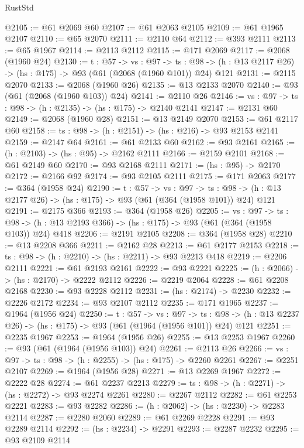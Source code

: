 \begin{lexlean}{RustStd}
\begin{coremodule}
@2105 := @61 @2069 @60
@2107 := @61 @2063 @2105
@2109 := @61 @1965 @2107
@2110 := @65 @2070
@2111 := @2110 @64
@2112 := @393 @2111
@2113 := @65 @1967
@2114 := @2113 @2112
@2115 := @171 @2069
@2117 := @2068 (@1960 @24)
@2130 := {t : @57} ->
  {vs : @97} ->
  {ts : @98} -> (h : @13 @2117 @26) -> (hs : @175) -> @93 (@61 (@2068 (@1960 @101)) @24) @121
@2131 := @2115 @2070
@2133 := @2068 (@1960 @26)
@2135 := @13 @2133 @2070
@2140 := @93 (@61 (@2068 (@1960 @103)) @24)
@2141 := @2110 @26
@2146 := {vs : @97} -> {ts : @98} -> (h : @2135) -> (hs : @175) -> @2140 @2141
@2147 := @2131 @60
@2149 := @2068 (@1960 @28)
@2151 := @13 @2149 @2070
@2153 := @61 @2117 @60
@2158 := {ts : @98} -> (h : @2151) -> (hs : @216) -> @93 @2153 @2141
@2159 := @2147 @64
@2161 := @61 @2133 @60
@2162 := @93 @2161
@2165 := (h : @2103) -> (hs : @95) -> @2162 @2111
@2166 := @2159 @2101
@2168 := @61 @2149 @60
@2170 := @93 @2168 @2111
@2171 := (hs : @95) -> @2170
@2172 := @2166 @92
@2174 := @93 @2105 @2111
@2175 := @171 @2063
@2177 := @364 (@1958 @24)
@2190 := {t : @57} ->
  {vs : @97} ->
  {ts : @98} -> (h : @13 @2177 @26) -> (hs : @175) -> @93 (@61 (@364 (@1958 @101)) @24) @121
@2191 := @2175 @366
@2193 := @364 (@1958 @26)
@2205 := {vs : @97} ->
  {ts : @98} -> (h : @13 @2193 @366) -> (hs : @175) -> @93 (@61 (@364 (@1958 @103)) @24) @418
@2206 := @2191 @2105
@2208 := @364 (@1958 @28)
@2210 := @13 @2208 @366
@2211 := @2162 @28
@2213 := @61 @2177 @2153
@2218 := {ts : @98} -> (h : @2210) -> (hs : @2211) -> @93 @2213 @418
@2219 := @2206 @2111
@2221 := @61 @2193 @2161
@2222 := @93 @2221
@2225 := (h : @2066) -> (hs : @2170) -> @2222 @2112
@2226 := @2219 @2064
@2228 := @61 @2208 @2168
@2230 := @93 @2228 @2112
@2231 := (hs : @2174) -> @2230
@2232 := @2226 @2172
@2234 := @93 @2107 @2112
@2235 := @171 @1965
@2237 := @1964 (@1956 @24)
@2250 := {t : @57} ->
  {vs : @97} ->
  {ts : @98} -> (h : @13 @2237 @26) -> (hs : @175) -> @93 (@61 (@1964 (@1956 @101)) @24) @121
@2251 := @2235 @1967
@2253 := @1964 (@1956 @26)
@2255 := @13 @2253 @1967
@2260 := @93 (@61 (@1964 (@1956 @103)) @24)
@2261 := @2113 @26
@2266 := {vs : @97} -> {ts : @98} -> (h : @2255) -> (hs : @175) -> @2260 @2261
@2267 := @2251 @2107
@2269 := @1964 (@1956 @28)
@2271 := @13 @2269 @1967
@2272 := @2222 @28
@2274 := @61 @2237 @2213
@2279 := {ts : @98} -> (h : @2271) -> (hs : @2272) -> @93 @2274 @2261
@2280 := @2267 @2112
@2282 := @61 @2253 @2221
@2283 := @93 @2282
@2286 := (h : @2062) -> (hs : @2230) -> @2283 @2114
@2287 := @2280 @2060
@2289 := @61 @2269 @2228
@2291 := @93 @2289 @2114
@2292 := (hs : @2234) -> @2291
@2293 := @2287 @2232
@2295 := @93 @2109 @2114

\end{coremodule}
\end{lexlean}
